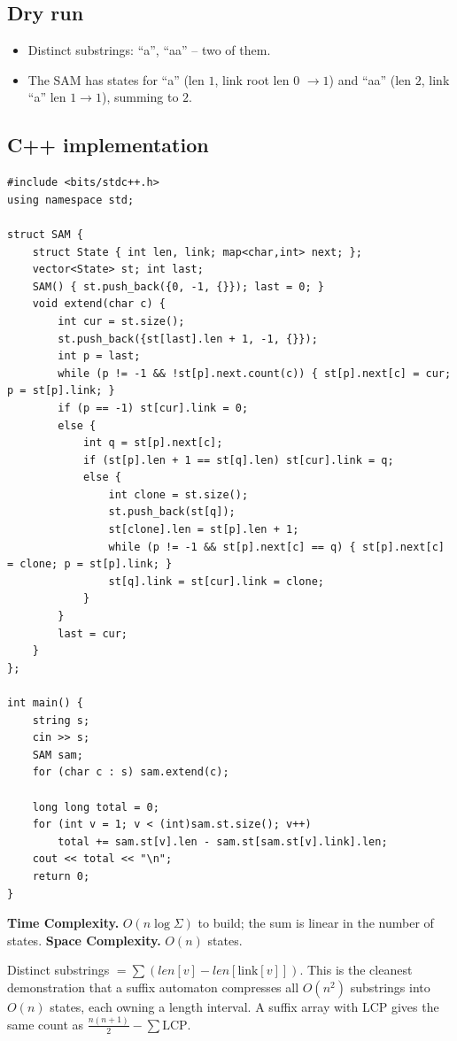 \subsection*{Dry run}


\begin{itemize}
  \item Distinct substrings: ``a'', ``aa'' -- two of them.
  \item The SAM has states for ``a'' (len $1$, link root len $0$
        $\to1$) and ``aa'' (len $2$, link ``a'' len $1\to1$), summing to
        $2$.
\end{itemize}

\subsection*{C++ implementation}

\begin{lstlisting}
#include <bits/stdc++.h>
using namespace std;

struct SAM {
    struct State { int len, link; map<char,int> next; };
    vector<State> st; int last;
    SAM() { st.push_back({0, -1, {}}); last = 0; }
    void extend(char c) {
        int cur = st.size();
        st.push_back({st[last].len + 1, -1, {}});
        int p = last;
        while (p != -1 && !st[p].next.count(c)) { st[p].next[c] = cur; p = st[p].link; }
        if (p == -1) st[cur].link = 0;
        else {
            int q = st[p].next[c];
            if (st[p].len + 1 == st[q].len) st[cur].link = q;
            else {
                int clone = st.size();
                st.push_back(st[q]);
                st[clone].len = st[p].len + 1;
                while (p != -1 && st[p].next[c] == q) { st[p].next[c] = clone; p = st[p].link; }
                st[q].link = st[cur].link = clone;
            }
        }
        last = cur;
    }
};

int main() {
    string s;
    cin >> s;
    SAM sam;
    for (char c : s) sam.extend(c);

    long long total = 0;
    for (int v = 1; v < (int)sam.st.size(); v++)
        total += sam.st[v].len - sam.st[sam.st[v].link].len;
    cout << total << "\n";
    return 0;
}
\end{lstlisting}

\begin{complexitybox}
\textbf{Time Complexity.} $O(n\log\Sigma)$ to build; the sum is linear in
the number of states. \textbf{Space Complexity.} $O(n)$ states.
\end{complexitybox}

\begin{takeawaybox}
Distinct substrings $=\sum(\textit{len}[v]-\textit{len}[\text{link}[v]])$.
This is the cleanest demonstration that a suffix automaton compresses all
$O(n^2)$ substrings into $O(n)$ states, each owning a length interval. A
suffix array with LCP gives the same count as
$\tfrac{n(n+1)}{2}-\sum\text{LCP}$.
\end{takeawaybox}
